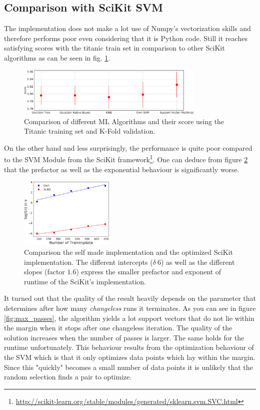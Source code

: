 \subsection{Comparison with SciKit SVM}
The implementation does not make a lot use of Numpy's vectorization skills and therefore performs poor even considering that it is Python code. Still it reaches satisfying scores with the titanic train set in comparison to other SciKit algorithms as can be seen in fig. \ref{fig:comparison}.

\begin{figure}
  \centering
    \includegraphics[width=0.8\textwidth]{media_saved/ml_comparison}
  \caption{Comparison of different ML Algorithms and their score using the Titanic training set and K-Fold validation.}  
  \label{fig:comparison}  
\end{figure}

On the other hand and less surprisingly, the performance is quite poor compared to the SVM Module from the SciKit framework\footnote{\url{http://scikit-learn.org/stable/modules/generated/sklearn.svm.SVC.html}}. One can deduce from figure \ref{fig:benchmark} that the prefactor as well as the exponential behaviour is significantly worse.

\begin{figure}
  \centering
    \includegraphics[width=0.4\textwidth]{media_saved/benchmark}
  \caption{Comparison the self made implementation and the optimized SciKit implementation. The different intercepts ($\delta ~ 6$) as well as the different slopes (factor $1.6$) express the smaller prefactor and exponent of runtime of the SciKit's implementation.}  
  \label{fig:benchmark}  
\end{figure}

It turned out that the quality of the result heavily depends on the parameter that determines after how many \textit{changeless} runs it terminates. As you can see in figure \ref{fig:max_passes}, the algorithm yields a lot support vectors that do not lie within the margin when it stops after one changeless iteration. The quality of the solution increases when the number of passes is larger. The same holds for the runtime unfortunately. This behaviour results from the optimization behaviour of the SVM which is that it only optimizes data points which lay within the margin. Since this "quickly" becomes a small number of data points it is unlikely that the random selection finds a pair to optimize.

